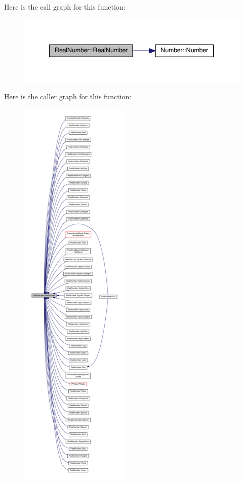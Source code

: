 Here is the call graph for this function\+:\nopagebreak
\begin{figure}[H]
\begin{center}
\leavevmode
\includegraphics[width=340pt]{structRealNumber_a65924261adb775498f3b1b0f41f89091_cgraph}
\end{center}
\end{figure}




Here is the caller graph for this function\+:\nopagebreak
\begin{figure}[H]
\begin{center}
\leavevmode
\includegraphics[height=550pt]{structRealNumber_a65924261adb775498f3b1b0f41f89091_icgraph}
\end{center}
\end{figure}


